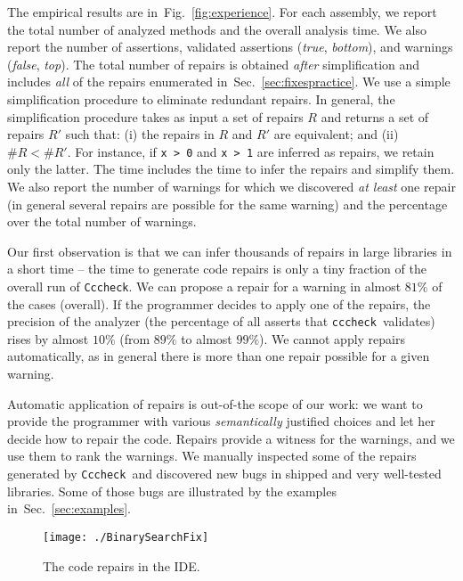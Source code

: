\documentclass[10pt]{sigplanconf}
\newcommand{\refSection}[1]{Sec.~\ref{sec:#1}}
\newcommand{\refFig}[1]{Fig.~\ref{fig:#1}}
\newcommand{\code}[1]{\texttt{#1}}
\newcommand{\clousot}{\code{cccheck}}
\newcommand{\Clousot}{\code{Cccheck}}
\begin{document}
The empirical results are in~\refFig{experience}.  For each assembly, we report the
total number of analyzed methods and the overall analysis time.
 We also report the number of assertions, validated assertions (\emph{true},
\emph{bottom}), and warnings (\emph{false}, \emph{top}).  The total
number of repairs is obtained \emph{after} simplification and includes
\emph{all} of the repairs enumerated in~\refSection{fixespractice}.  
We use a simple simplification procedure to eliminate redundant
repairs.    
In general, the simplification procedure takes as input a set of repairs $R$ and returns a set of repairs $R'$ such that: (i) the repairs in $R$ and $R'$ are equivalent; and (ii) $\#R < \#R'$.
For instance, if \code{x > 0} and \code{x > 1} are inferred
as repairs, we retain only the latter. 
The time includes the time to
infer the repairs and simplify them.  We also report the number of
warnings for which we discovered \emph{at least} one repair (in
general several repairs are possible for the same warning) and the
percentage over the total number of warnings.

Our first observation is that we can infer thousands of repairs in
large libraries in a short time --
the time to generate code repairs is only a tiny fraction of the overall run of \Clousot.
We can propose a repair for a warning in almost $81\%$ of the
cases (overall).  If the programmer decides to apply one of the
repairs, the precision of the analyzer (the percentage of all asserts
that \clousot\ validates) rises by almost $10\%$ (from $89\%$ to
almost $99\% $).  We cannot apply repairs automatically, as in general
there is more than one repair possible for a given warning.

Automatic application of repairs is out-of-the scope of our work:
we want to provide the programmer with various \emph{semantically}
justified choices and let her decide how to repair the code.  
Repairs provide a witness for the warnings, and we use them to rank the warnings.
We manually inspected some of the repairs generated by \Clousot\ and
discovered new bugs in shipped and very well-tested libraries.  Some
of those bugs are illustrated by the examples
in~\refSection{examples}.

\begin{figure}
\texttt{[image: ./BinarySearchFix]} 
\caption{The code repairs in the IDE.}
\label{fig:roslyn}
\end{figure}
\end{document}
